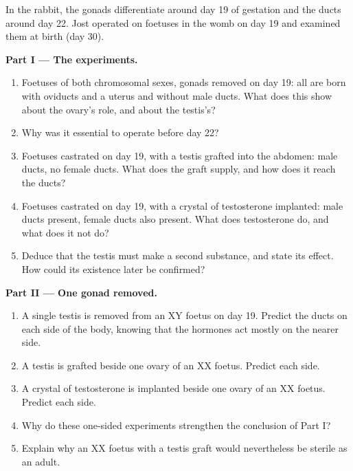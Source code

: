 \begin{problem}
\label{pb:g11:becoming-male-female:1}
In the rabbit, the gonads differentiate around day 19 of gestation and
the ducts around day 22. Jost operated on foetuses in the womb on day
19 and examined them at birth (day 30).

\medskip
\noindent\textbf{Part I --- The experiments.}
\begin{enumerate}
  \item Foetuses of both chromosomal sexes, gonads removed on day 19:
        all are born with oviducts and a uterus and without male
        ducts. What does this show about the ovary's role, and about
        the testis's?
  \item Why was it essential to operate before day 22?
  \item Foetuses castrated on day 19, with a testis grafted into the
        abdomen: male ducts, no female ducts. What does the graft
        supply, and how does it reach the ducts?
  \item Foetuses castrated on day 19, with a crystal of testosterone
        implanted: male ducts present, female ducts also present.
        What does testosterone do, and what does it not do?
  \item Deduce that the testis must make a second substance, and state
        its effect. How could its existence later be confirmed?
\end{enumerate}

\medskip
\noindent\textbf{Part II --- One gonad removed.}
\begin{enumerate}[resume]
  \item A single testis is removed from an XY foetus on day 19. Predict
        the ducts on each side of the body, knowing that the hormones
        act mostly on the nearer side.
  \item A testis is grafted beside one ovary of an XX foetus. Predict
        each side.
  \item A crystal of testosterone is implanted beside one ovary of an
        XX foetus. Predict each side.
  \item Why do these one-sided experiments strengthen the conclusion
        of Part I?
  \item Explain why an XX foetus with a testis graft would
        nevertheless be sterile as an adult.
\end{enumerate}


\end{problem}
